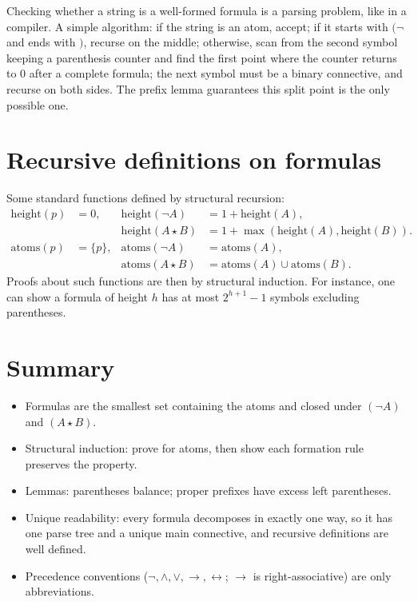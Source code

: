 \begin{aside}
Checking whether a string is a well-formed formula is a parsing problem, like in a
compiler. A simple algorithm: if the string is an atom, accept; if it starts with
$(\neg$ and ends with $)$, recurse on the middle; otherwise, scan from the second symbol
keeping a parenthesis counter and find the first point where the counter returns to $0$
after a complete formula; the next symbol must be a binary connective, and recurse on
both sides. The prefix lemma guarantees this split point is the only possible one.
\end{aside}

\section{Recursive definitions on formulas}

Some standard functions defined by structural recursion:
\begin{align*}
  \mathrm{height}(p) &= 0, &
  \mathrm{height}(\neg A) &= 1 + \mathrm{height}(A), \\
  && \mathrm{height}(A\star B) &= 1+\max(\mathrm{height}(A),\mathrm{height}(B)).\\
  \mathrm{atoms}(p) &= \{p\}, &
  \mathrm{atoms}(\neg A) &= \mathrm{atoms}(A), \\
  && \mathrm{atoms}(A\star B) &= \mathrm{atoms}(A)\cup\mathrm{atoms}(B).
\end{align*}
Proofs about such functions are then by structural induction. For instance, one can show
a formula of height $h$ has at most $2^{h+1}-1$ symbols excluding parentheses.

\section*{Summary}
\begin{itemize}
  \item Formulas are the smallest set containing the atoms and closed under
        $(\neg A)$ and $(A\star B)$.
  \item Structural induction: prove for atoms, then show each formation rule preserves
        the property.
  \item Lemmas: parentheses balance; proper prefixes have excess left parentheses.
  \item Unique readability: every formula decomposes in exactly one way, so it has one
        parse tree and a unique main connective, and recursive definitions are well
        defined.
  \item Precedence conventions ($\neg,\land,\lor,\to,\leftrightarrow$; $\to$ is
        right-associative) are only abbreviations.
\end{itemize}
